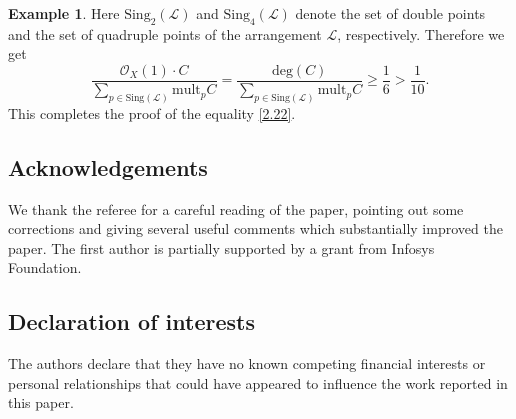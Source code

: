 \documentclass[12pt,reqno]{amsart}
\theoremstyle{plain}
\numberwithin{equation}{section}
\theoremstyle{definition}
\newtheorem{example}[theorem]{Example}
\begin{document}
\begin{example}
Here $\text{Sing}_2(\mathcal{L})$ and $\text{Sing}_4(\mathcal{L})$ denote the set of double points and the set of quadruple points of the arrangement $\mathcal{L}$, respectively. Therefore we get 
		\[
		\frac{\mathcal{O}_X(1) \cdot C}{\sum\limits_{p \in \text{Sing}(\mathcal{L})} \text{mult}_{p}C} = \frac{\text{deg}(C)}{ \sum\limits_{p \in\text{Sing}(\mathcal{L})} \text{mult}_{p}C} \geq \frac{1}{6} > \frac{1}{10}.
		\]
		This completes the proof of the equality \eqref{2.22}.

		
		
	\end{example}

 \subsection*{Acknowledgements} We thank the referee for a careful reading of the paper, pointing out some corrections and giving several useful comments which substantially improved the paper. The first author is partially supported by a grant from Infosys Foundation. 
	
\subsection*{Declaration of interests}
The authors declare that they have no known competing financial interests or personal relationships
that could have appeared to influence the work reported in this paper. 
		
\end{document}
